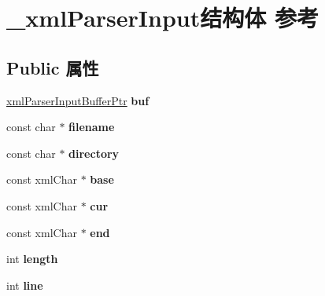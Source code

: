 \hypertarget{struct__xml_parser_input}{}\section{\+\_\+xml\+Parser\+Input结构体 参考}
\label{struct__xml_parser_input}
\subsection*{Public 属性}
\begin{DoxyCompactItemize}
\item 
\mbox{\label{struct__xml_parser_input_ab50ed3b4b2f13d9c298d901395dfa531}} 
\hyperlink{struct__xml_parser_input_buffer}{xml\+Parser\+Input\+Buffer\+Ptr} {\bfseries buf}
\item 
\mbox{\label{struct__xml_parser_input_a3536fa06529d1a11fdc4458b00d2680c}} 
const char $\ast$ {\bfseries filename}
\item 
\mbox{\label{struct__xml_parser_input_adaf128e5827e8a2851f8c2247983affc}} 
const char $\ast$ {\bfseries directory}
\item 
\mbox{\label{struct__xml_parser_input_ab2b245c3945ad6ad057f6a625350d282}} 
const xml\+Char $\ast$ {\bfseries base}
\item 
\mbox{\label{struct__xml_parser_input_afc89c81a4d16f75444fb03a77b03df65}} 
const xml\+Char $\ast$ {\bfseries cur}
\item 
\mbox{\label{struct__xml_parser_input_ab1cd43c8dae0a799db05df0c07c51030}} 
const xml\+Char $\ast$ {\bfseries end}
\item 
\mbox{\label{struct__xml_parser_input_a12d4752740620b43cc8fd64d13a7f91d}} 
int {\bfseries length}
\item 
\mbox{\label{struct__xml_parser_input_a52689e7ee99ea4f70fea0da521371d43}} 
int {\bfseries line}
\item 
\mbox{\label{struct__xml_parser_input_a9be0a6d559062188aec7158b94cdde29}} 

\end{DoxyCompactItemize}
